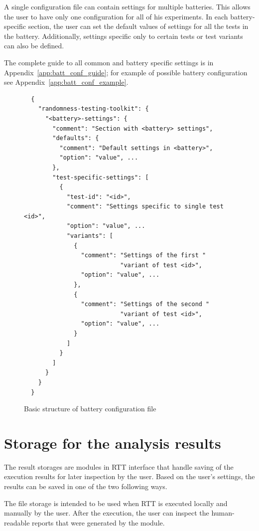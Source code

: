 \documentclass[
	digital,    %
	oneside,
	color,
	11pt,
	nocover,
	notable,
	nolof,
	nolot,
]{fithesis3}
\theoremstyle{definition}
\theoremstyle{remark}
\begin{document}
A single configuration file can contain settings for multiple batteries. This allows the user to have only one configuration for all of his experiments. In each battery-specific section, the user can set the default values of settings for all the tests in the battery. Additionally, settings specific only to certain tests or test variants can also be defined. 

The complete guide to all common and battery specific settings is in Appendix~\ref{app:batt_conf_guide}; for example of possible battery configuration see Appendix~\ref{app:batt_conf_example}.

\begin{figure}[h!]
\begin{verbatim}
  {
    "randomness-testing-toolkit": {
      "<battery>-settings": {
        "comment": "Section with <battery> settings",
        "defaults": {
          "comment": "Default settings in <battery>",
          "option": "value", ...
        },
        "test-specific-settings": [
          {
            "test-id": "<id>",
            "comment": "Settings specific to single test <id>",
            "option": "value", ...
            "variants": [
              {
                "comment": "Settings of the first "
                           "variant of test <id>",
                "option": "value", ...
              },
              {
                "comment": "Settings of the second "
                           "variant of test <id>",
                "option": "value", ...        
              }            
            ]	      
          }
        ]      
      }    
    }
  }
\end{verbatim}
\caption{Basic structure of battery configuration file}
\label{fig:batt_conf_short_json}
\end{figure}

\section{Storage for the analysis results}
\label{sec:result_storages}
The result storages are modules in RTT interface that handle saving of the execution results for later inspection by the user. Based on the user's settings, the results can be saved in one of the two following ways.

The file storage is intended to be used when RTT is executed locally and manually by the user. After the execution, the user can inspect the human-readable reports that were generated by the module. 
\end{document}
